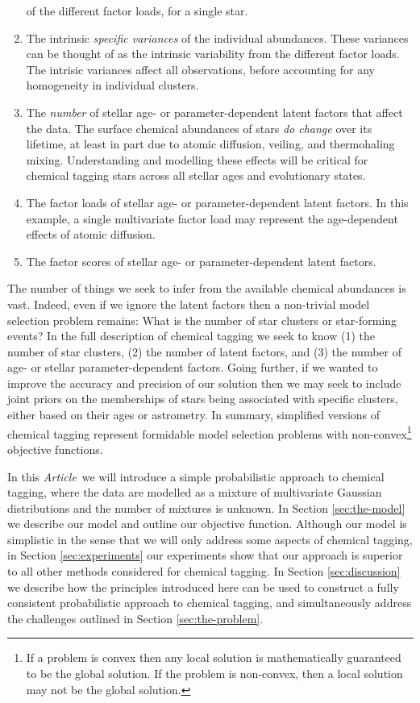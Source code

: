 \documentclass{aastex61}
\newcommand{\article}{\emph{Article}}
\begin{document}
\begin{enumerate}
        of the different factor loads, for a single star.
  \item The intrinsic \emph{specific variances} of the individual abundances.
        These variances can be thought of as the intrinsic variability from 
        the different factor loads.
        The intrisic variances affect all observations, before accounting for
        any homogeneity in individual clusters.
  \item The \emph{number} of stellar age- or parameter-dependent latent 
        factors that affect the data. 
        The surface chemical abundances of stars \emph{do change} over its
        lifetime, at least in part due to atomic diffusion, veiling, and 
        thermohaling mixing. %
        Understanding and modelling these effects will be critical for 
        chemical tagging stars across all stellar ages and evolutionary states.
  \item The factor loads of stellar age- or parameter-dependent latent factors.
        In this example, a single multivariate factor load may represent the
        age-dependent effects of atomic diffusion.
  \item The factor scores of stellar age- or parameter-dependent latent 
        factors.
\end{enumerate}


The number of things we seek to infer from the available chemical abundances
is vast.
Indeed, even if we ignore the latent factors then a non-trivial model
selection problem remains: What is the number of star clusters or star-forming 
events?
In the full description of chemical tagging we seek to know (1) the number of
star clusters, (2) the number of latent factors, and (3) the number of age-
or stellar parameter-dependent factors.
Going further, if we wanted to improve the accuracy and precision of our
solution then we may seek to include joint priors on the memberships of stars
being associated with specific clusters, either based on their ages or
astrometry.
In summary, simplified versions of chemical tagging represent formidable model
selection problems with non-convex\footnote{
  If a problem is convex then any local solution is mathematically guaranteed
  to be the global solution.
  If the problem is non-convex, then a local solution may not be the global
  solution.
} objective functions.





In this \article\ we will introduce a simple probabilistic approach to
chemical tagging, where the data are modelled as a mixture of multivariate
Gaussian distributions and the number of mixtures is unknown.
In Section \ref{sec:the-model} we describe our model and outline our objective
function.
Although our model is simplistic in the sense that we will only address some
aspects of chemical tagging, in Section \ref{sec:experiments} our experiments
show that our approach is superior to all other methods considered 
for chemical tagging.
In Section \ref{sec:discussion} we describe how the principles introduced here
can be used to construct a fully consistent probabilistic approach to chemical
tagging, and simultaneously address the challenges outlined in Section 
\ref{sec:the-problem}.
\end{document}
